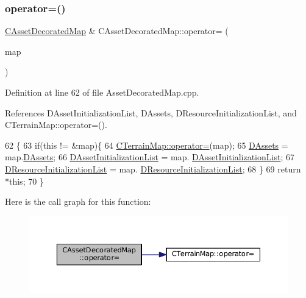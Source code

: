\subsubsection{\texorpdfstring{operator=()}{operator=()}}
{\footnotesize\ttfamily \hyperlink{classCAssetDecoratedMap}{C\+Asset\+Decorated\+Map} \& C\+Asset\+Decorated\+Map\+::operator= (\begin{DoxyParamCaption}\item[{const \hyperlink{classCAssetDecoratedMap}{C\+Asset\+Decorated\+Map} \&}]{map }\end{DoxyParamCaption})}



Definition at line 62 of file Asset\+Decorated\+Map.\+cpp.



References D\+Asset\+Initialization\+List, D\+Assets, D\+Resource\+Initialization\+List, and C\+Terrain\+Map\+::operator=().


\begin{DoxyCode}
62                                                                               \{
63     \textcolor{keywordflow}{if}(\textcolor{keyword}{this} != &map)\{
64         \hyperlink{classCTerrainMap_ad9f476d5d4db6de2907dfa3d4d9de7e6}{CTerrainMap::operator=}(map);
65         \hyperlink{classCAssetDecoratedMap_a94eeed5b16141169b1ba6cb3842055aa}{DAssets} = map.\hyperlink{classCAssetDecoratedMap_a94eeed5b16141169b1ba6cb3842055aa}{DAssets};
66         \hyperlink{classCAssetDecoratedMap_a2b7bf2e9a19a9173093cef32048608c2}{DAssetInitializationList} = map.
      \hyperlink{classCAssetDecoratedMap_a2b7bf2e9a19a9173093cef32048608c2}{DAssetInitializationList};
67         \hyperlink{classCAssetDecoratedMap_ab4c78aeb90280ea98a3aa542cdb7f8cc}{DResourceInitializationList} = map.
      \hyperlink{classCAssetDecoratedMap_ab4c78aeb90280ea98a3aa542cdb7f8cc}{DResourceInitializationList};
68     \}
69     \textcolor{keywordflow}{return} *\textcolor{keyword}{this};
70 \}
\end{DoxyCode}
Here is the call graph for this function\+:\nopagebreak
\begin{figure}[H]
\begin{center}
\leavevmode
\includegraphics[width=350pt]{classCAssetDecoratedMap_a0330faaf18f597b5e2ebbbfcd8bf2819_cgraph}
\end{center}
\end{figure}
\hypertarget{classCAssetDecoratedMap_a1ead2938a9585fa82b5b5ef72efe6eba}{}\label{classCAssetDecoratedMap_a1ead2938a9585fa82b5b5ef72efe6eba} 
